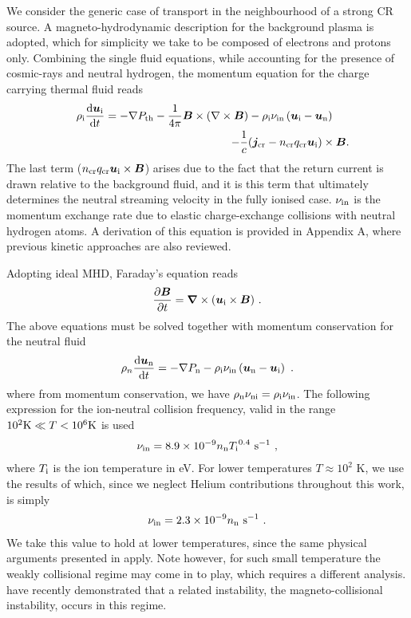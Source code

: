 \documentclass[a4paper,fleqn,usenatbib]{mnras}
\newcommand{\eqb}{\begin{eqnarray}}
\newcommand{\eqe}{\end{eqnarray}}
\newcommand\comment[1]{{#1}}
\begin{document}
We consider the generic case of transport in the neighbourhood of a strong CR source. A magneto-hydrodynamic description for the background plasma is adopted, which for simplicity we take to be composed of electrons and protons only. Combining the single fluid equations, while accounting for the presence of cosmic-rays and neutral hydrogen, the momentum equation for the charge carrying thermal fluid reads \citep{Bell04,Reville07}
\eqb
\label{momEqn}
&&\rho_{\rm i} \frac{\mathrm{d} \boldsymbol{u}_{\rm i}}{\mathrm{d} t} =-\nabla P_{\rm th}-\frac{1}{4 \pi} \boldsymbol{B} \times(\nabla \times \boldsymbol{B})-\rho_{\rm i}\nu_{\mathrm{in}}\left(\boldsymbol{u}_{\mathrm{i}}-\boldsymbol{u}_{\mathrm{n}}\right)
   \enspace \enspace \enspace \nonumber \\
 & &   \enspace \enspace \enspace    \enspace \enspace \enspace   \enspace \enspace \enspace    \enspace \enspace \enspace -
\frac{1}{c}(\boldsymbol{j}_{\mathrm{cr}}-n_{\mathrm{cr}} q_{\rm cr} \boldsymbol{u}_{\rm i}) \times \boldsymbol{B} .
\eqe
The last term  ($n_{\mathrm{cr}} q_{\rm cr} \boldsymbol{u}_{\rm i}\times  \boldsymbol{B}$) arises due to the fact that the return current is drawn relative to the background fluid, and it is this term that ultimately determines the neutral streaming velocity in the fully ionised case. $\nu_{\rm in}$ is the momentum exchange rate due to elastic charge-exchange collisions with neutral hydrogen atoms. \comment{A derivation of this equation is provided in Appendix A, where previous kinetic approaches are also reviewed.}

Adopting ideal MHD, Faraday's equation reads
\eqb
\frac{\partial \boldsymbol{B}}{\partial t}=\bm{\nabla}  \times( \boldsymbol{u}_{\rm i} \times \boldsymbol{B})~.
\eqe
The above equations must be solved together with momentum conservation for the neutral fluid 
\eqb
 \rho_n\frac{\mathrm{d} \boldsymbol{u}_{\rm n}}{\mathrm{d} t }= -\nabla P_{\rm n} -{\rho}_{\rm i}\nu_{\mathrm{in}}\left(\boldsymbol{u}_{\mathrm{n}}-\boldsymbol{u}_{\mathrm{i}}\right) ~.
\eqe
where from momentum conservation, we have $\rho_{\rm n}\nu_{\rm ni} = {\rho}_{\rm i}\nu_{\mathrm{in}}$.
The following expression for the ion-neutral collision frequency, valid in the range $10^2 {\rm K} \ll T < 10^6 {\rm K}$ \citep{KulsrudCesarsky71} is used
\eqb
\nu_{\rm in} = 8.9\times 10^{-9} n_{\rm n} {T_{\rm i}}^{0.4} ~{\rm s}^{-1} ~,
\eqe 
where $T_{\rm i}$ is the ion temperature in eV. For lower temperatures $T \approx 10^2$ K, we use the results of \cite{Osterbrock} which, since we neglect Helium contributions throughout this work, is simply  
\eqb
\nu_{\rm in} = 2.3\times 10^{-9} {n}_{\rm n} ~{\rm s}^{-1} ~.
\eqe
We take this value to hold at lower temperatures, since the same physical arguments presented in \cite{Osterbrock} apply. Note however, for such small temperature the weakly collisional regime may come in to play, which requires a different analysis. \cite{Bell20} have recently demonstrated that a related instability, the magneto-collisional instability, occurs in this regime.
\end{document}

